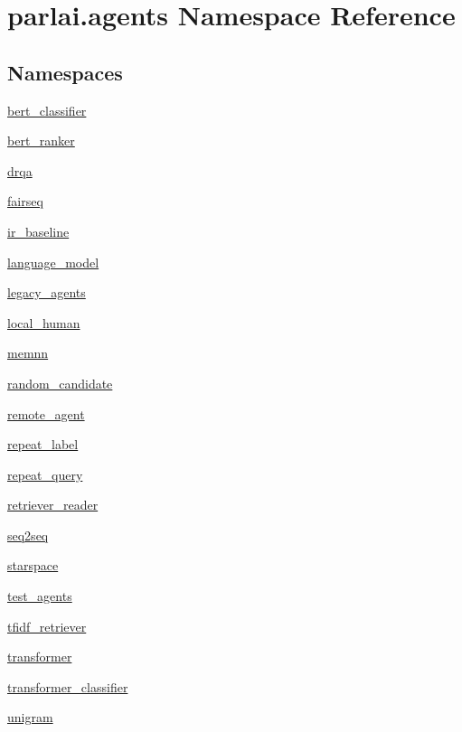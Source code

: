 \hypertarget{namespaceparlai_1_1agents}{}\section{parlai.\+agents Namespace Reference}
\label{namespaceparlai_1_1agents}
\subsection*{Namespaces}
\begin{DoxyCompactItemize}
\item 
 \hyperlink{namespaceparlai_1_1agents_1_1bert__classifier}{bert\+\_\+classifier}
\item 
 \hyperlink{namespaceparlai_1_1agents_1_1bert__ranker}{bert\+\_\+ranker}
\item 
 \hyperlink{namespaceparlai_1_1agents_1_1drqa}{drqa}
\item 
 \hyperlink{namespaceparlai_1_1agents_1_1fairseq}{fairseq}
\item 
 \hyperlink{namespaceparlai_1_1agents_1_1ir__baseline}{ir\+\_\+baseline}
\item 
 \hyperlink{namespaceparlai_1_1agents_1_1language__model}{language\+\_\+model}
\item 
 \hyperlink{namespaceparlai_1_1agents_1_1legacy__agents}{legacy\+\_\+agents}
\item 
 \hyperlink{namespaceparlai_1_1agents_1_1local__human}{local\+\_\+human}
\item 
 \hyperlink{namespaceparlai_1_1agents_1_1memnn}{memnn}
\item 
 \hyperlink{namespaceparlai_1_1agents_1_1random__candidate}{random\+\_\+candidate}
\item 
 \hyperlink{namespaceparlai_1_1agents_1_1remote__agent}{remote\+\_\+agent}
\item 
 \hyperlink{namespaceparlai_1_1agents_1_1repeat__label}{repeat\+\_\+label}
\item 
 \hyperlink{namespaceparlai_1_1agents_1_1repeat__query}{repeat\+\_\+query}
\item 
 \hyperlink{namespaceparlai_1_1agents_1_1retriever__reader}{retriever\+\_\+reader}
\item 
 \hyperlink{namespaceparlai_1_1agents_1_1seq2seq}{seq2seq}
\item 
 \hyperlink{namespaceparlai_1_1agents_1_1starspace}{starspace}
\item 
 \hyperlink{namespaceparlai_1_1agents_1_1test__agents}{test\+\_\+agents}
\item 
 \hyperlink{namespaceparlai_1_1agents_1_1tfidf__retriever}{tfidf\+\_\+retriever}
\item 
 \hyperlink{namespaceparlai_1_1agents_1_1transformer}{transformer}
\item 
 \hyperlink{namespaceparlai_1_1agents_1_1transformer__classifier}{transformer\+\_\+classifier}
\item 
 \hyperlink{namespaceparlai_1_1agents_1_1unigram}{unigram}
\end{DoxyCompactItemize}

